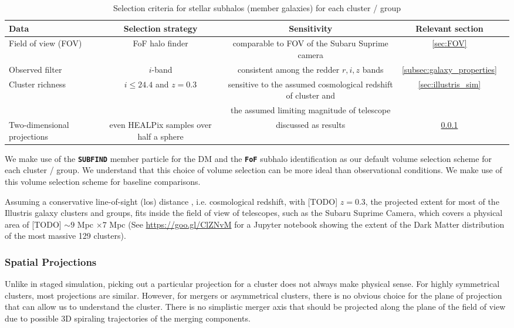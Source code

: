 \begin{table*}
\begin{center}
\begin{minipage}{180mm} 
	\caption{ Selection criteria for stellar subhalos (member galaxies) for each
		cluster / group 
\label{tab:member_galaxy_selections}} 
	\begin{tabular}{@{}lcccc@{}}
\hline 
Data &  Selection strategy  & Sensitivity & Relevant section  \\ \hline
Field of view (FOV) & FoF halo finder& comparable to FOV of the Subaru
Suprime camera & \ref{sec:FOV}  \\ 
Observed filter & $i$-band & consistent among the redder $r, i, z$ bands &   
\ref{subsec:galaxy_properties}
\\ 
Cluster richness  & $i \leq 24.4$ and $z = 0.3$  & sensitive to
the assumed cosmological redshift of cluster and & \ref{sec:illustris_sim} \\ 
& & the assumed limiting magnitude of telescope &   \\
Two-dimensional projections & even HEALPix samples over half a sphere &
discussed as results  & \ref{subsubsec:projections}\\  
\hline
\end{tabular} 
\footnotesize{
}
\end{minipage}
\end{center} 
\end{table*}

We make use of the {\bf \texttt{SUBFIND}} member particle for the DM and the 
{\bf \texttt{FoF}} subhalo identification as our
default volume selection scheme for each cluster / group.
We understand that this choice of volume selection can be more ideal than
observational conditions. We make use of this volume selection scheme
for baseline comparisons. 

Assuming a conservative line-of-sight (los) distance 
, i.e. cosmological redshift, with [TODO] $z = 0.3$, 
the projected extent for most of the Illustris galaxy clusters and groups, 
fits inside the field of view of telescopes, such as the Subaru Suprime Camera,
which covers a physical area of [TODO] $\sim 9$ Mpc $\times 7$ Mpc 
(See \href{https://goo.gl/ClZNvM}{https://goo.gl/ClZNvM} for a Jupyter notebook 
showing the extent of the Dark Matter distribution of the most massive 129
clusters).

\subsubsection{Spatial Projections}
\label{subsubsec:projections}
Unlike in staged simulation, picking out a particular projection for a cluster 
does not always make physical sense.
For highly symmetrical clusters, most projections are similar. 
However, for mergers or asymmetrical clusters, 
there is no obvious choice for the plane of projection that can allow us to
understand the cluster. There is no simplistic merger axis that should be 
projected along the plane of the field of view due to possible 3D spiraling
trajectories of the merging components. 

